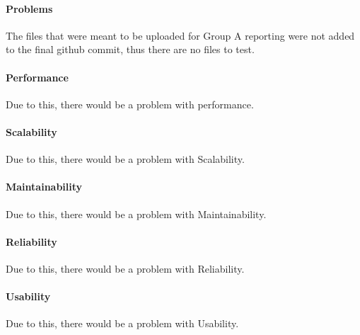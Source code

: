 
\paragraph{Problems}
The files that were meant to be uploaded for Group A reporting were not added to the final github commit, thus there are no files to test.

\paragraph{Performance}
	Due to this, there would be a problem with performance.
	
\paragraph{Scalability}
	Due to this, there would be a problem with Scalability.

\paragraph{Maintainability}
	Due to this, there would be a problem with Maintainability.
		
\paragraph{Reliability}
	Due to this, there would be a problem with Reliability.
		
\paragraph{Usability}
	Due to this, there would be a problem with Usability.
	
		
		
